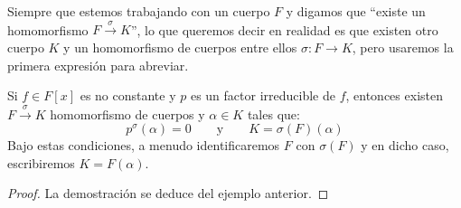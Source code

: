 \begin{notacion}
    Siempre que estemos trabajando con un cuerpo $F$ y digamos que ``existe un homomorfismo $F\stackrel{\sigma}{\to}K$'', lo que queremos decir en realidad es que existen otro cuerpo $K$ y un homomorfismo de cuerpos entre ellos $\sigma:F\to K$, pero usaremos la primera expresión para abreviar.
\end{notacion}

\begin{lema}\label{lema:cuerpo_descomposicion}
    Si $f\in F[x]$ es no constante y $p$ es un factor irreducible de $f$, entonces existen $F\stackrel{\sigma}{\to}K$ homomorfismo de cuerpos y $\alpha\in K$ tales que:
    \begin{equation*}
        p^\sigma(\alpha) = 0 \qquad \text{y}\qquad  K = \sigma(F)(\alpha)
    \end{equation*}
    Bajo estas condiciones, a menudo identificaremos $F$ con $\sigma(F)$ y en dicho caso, escribiremos $K= F(\alpha)$.
    \begin{proof}
        La demostración se deduce del ejemplo anterior.
    \end{proof}
\end{lema}

